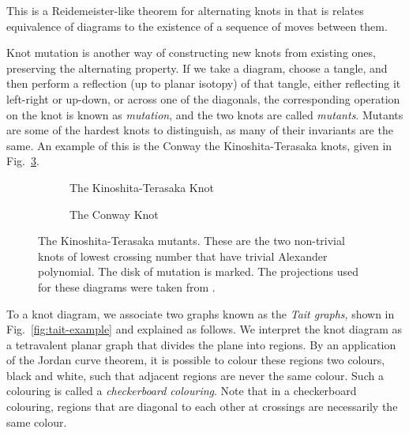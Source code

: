 \documentclass[12pt]{report}
\theoremstyle{upright}
\begin{document}
This is a Reidemeister-like theorem for alternating knots in that is relates equivalence of diagrams to the existence of a sequence of moves between them.

Knot mutation is another way of constructing new knots from existing ones, preserving the alternating property. If we take a diagram, choose a tangle, and then perform a reflection (up to planar isotopy) of that tangle, either reflecting it left-right or up-down, or across one of the diagonals, the corresponding operation on the knot is known as \textit{mutation}, and the two knots are called \textit{mutants}. Mutants are some of the hardest knots to distinguish, as many of their invariants are the same. An example of this is the Conway the Kinoshita-Terasaka knots, given in Fig.~\ref{fig:kinoshita-terasaka-mutants}.

\begin{figure}[hbt!]
	\centering
	\hspace*{\fill}
	\begin{subfigure}[b]{0.4 \textwidth}
		\centering
		\def\svgscale{0.25}
		
		\caption{The Kinoshita-Terasaka Knot}
		\label{fig:kinoshita-terasaka-knot}
	\end{subfigure}
	\hspace*{\fill} \hspace*{\fill}	\hspace*{\fill}
	\begin{subfigure}[b]{0.4 \textwidth}
		\centering
		\def\svgscale{0.25}
		
		\caption{The Conway Knot}
		\label{fig:conway-knot}
	\end{subfigure}
	\hspace*{\fill} 
	\caption{The Kinoshita-Terasaka mutants. These are the two non-trivial knots of lowest crossing number that have trivial Alexander polynomial. The disk of mutation is marked. The projections used for these diagrams were taken from \cite[Fig.~2.32]{the-knot-book}.}
	\label{fig:kinoshita-terasaka-mutants}
\end{figure}

To a knot diagram, we associate two graphs known as the \textit{Tait graphs}, shown in Fig.~\ref{fig:tait-example} and explained as follows. We interpret the knot diagram as a tetravalent planar graph that divides the plane into regions. By an application of the Jordan curve theorem, it is possible to colour these regions two colours, black and white, such that adjacent regions are never the same colour. Such a colouring is called a \textit{checkerboard colouring}. Note that in a checkerboard colouring, regions that are diagonal to each other at crossings are necessarily the same colour.
\end{document}
